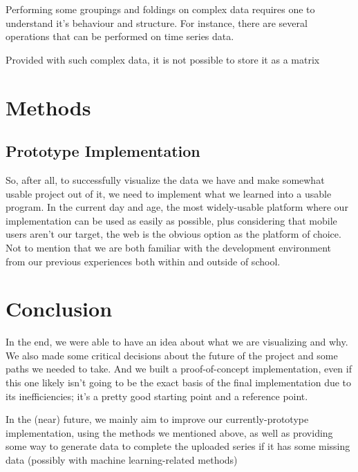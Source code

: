 \documentclass[11pt]{article}
\begin{document}
Performing some groupings and foldings on complex data requires one to understand it's behaviour and structure. For instance, there are several operations that can be performed on time series data. 

Provided with such complex data, it is not possible to store it as a matrix 


\section{Methods}



\subsection {Prototype Implementation}


So, after all, to successfully visualize the data we have and make somewhat usable project out of it, we need to implement what we learned into a usable program. In the current day and age, the most widely-usable platform where our implementation can be used as easily as possible, plus considering that mobile users aren't our target, the web is the obvious option as the platform of choice. Not to mention that we are both familiar with the development environment from our previous experiences both within and outside of school.

\section {Conclusion} 

In the end, we were able to have an idea about what we are visualizing and why. We also made some critical decisions about the future of the project and some paths we needed to take. And we built a proof-of-concept implementation, even if this one likely isn't going to be the exact basis of the final implementation due to its inefficiencies; it's a pretty good starting point and a reference point.

In the (near) future, we mainly aim to improve our currently-prototype implementation, using the methods we mentioned above, as well as providing some way to generate data to complete the uploaded series if it has some missing data (possibly with machine learning-related methods)
\end{document}
